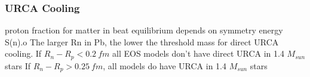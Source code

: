 \subsubsection{URCA Cooling}
proton fraction for matter in beat equilibrium depends on symmetry energy S(n).o
The larger Rn in Pb, the lower the threshold mass for direct URCA cooling.
If $R_n - R_p < 0.2 \ fm$ all EOS models don't have direct URCA in 1.4 $M_{sun}$ stars
If $R_n - R_p > 0.25 \ fm$, all models do have URCA in 1.4 $M_{sun}$ stars

